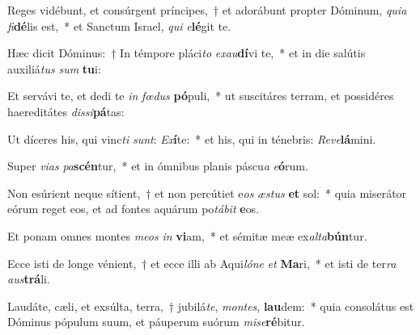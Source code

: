 \item Reges vidébunt, et consúrgent príncipes,~† et adorábunt propter Dóminum, \textit{qui}\textit{a} \textit{fi}\textbf{dé}lis est,~* et Sanctum Israel, \textit{qui} \textit{e}\textbf{lé}git te.
\item Hæc dicit Dóminus:~† In témpore pláci\textit{to} \textit{ex}\textit{au}\textbf{dí}vi te,~* et in die salútis auxiliá\textit{tus} \textit{sum} \textbf{tu}i:
\item Et servávi te, et dedi te \textit{in} \textit{fœ}\textit{dus} \textbf{pó}puli,~* ut suscitáres terram, et possidéres haereditátes \textit{dis}\textit{si}\textbf{pá}tas:
\item Ut díceres his, qui vinc\textit{ti} \textit{sunt}: \textit{Ex}\textbf{í}te:~* et his, qui in ténebris: \textit{Re}\textit{ve}\textbf{lá}mini.
\item Super \textit{vi}\textit{as} \textit{pa}\textbf{scén}tur,~* et in ómnibus planis páscu\textit{a} \textit{e}\textbf{ó}rum.
\item Non esúrient neque sítient,~† et non percútiet e\textit{os} \textit{æs}\textit{tus} \textbf{et} sol:~* quia miserátor eórum reget eos, et ad fontes aquárum po\textit{tá}\textit{bit} \textbf{e}os.
\item Et ponam omnes montes \textit{me}\textit{os} \textit{in} \textbf{vi}am,~* et sémitæ meæ ex\textit{al}\textit{ta}\textbf{bún}tur.
\item Ecce isti de longe vénient,~† et ecce illi ab Aqui\textit{ló}\textit{ne} \textit{et} \textbf{Ma}ri,~* et isti de ter\textit{ra} \textit{aus}\textbf{trá}li.
\item Laudáte, cæli, et exsúlta, terra,~† jubilá\textit{te}, \textit{mon}\textit{tes}, \textbf{lau}dem:~* quia consolátus est Dóminus pópulum suum, et páuperum suórum \textit{mi}\textit{se}\textbf{ré}bitur.
